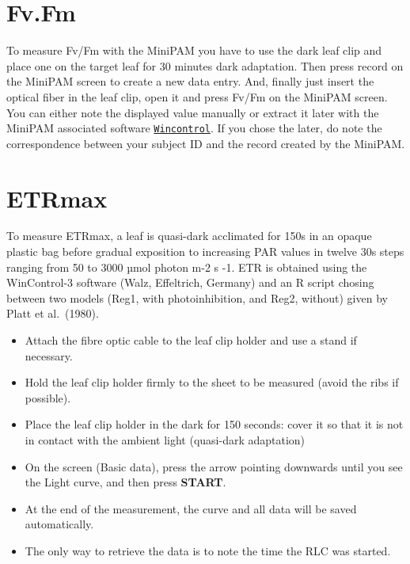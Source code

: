 \documentclass[
  12pt,
  american,
  a4paper,
  extrafontsizes,onecolumn,openright
  ]{memoir}
\providecommand{\tightlist}{%
  \setlength{\itemsep}{0pt}\setlength{\parskip}{0pt}}
\begin{document}
\hypertarget{fv.fm}{%
\section{Fv.Fm}\label{fv.fm}}

To measure Fv/Fm with the MiniPAM you have to use the dark leaf clip and place one on the target leaf for 30 minutes dark adaptation.
Then press record on the MiniPAM screen to create a new data entry.
And, finally just insert the optical fiber in the leaf clip, open it and press Fv/Fm on the MiniPAM screen.
You can either note the displayed value manually or extract it later with the MiniPAM associated software \href{https://www.walz.com/products/chl_p700/mini-pam-II/downloads.html}{\texttt{Wincontrol}}.
If you chose the later, do note the correspondence between your subject ID and the record created by the MiniPAM.

\hypertarget{etrmax}{%
\section{ETRmax}\label{etrmax}}

To measure ETRmax, a leaf is quasi-dark acclimated for 150s in an opaque plastic bag before gradual exposition to increasing PAR values in twelve 30s steps ranging from 50 to 3000 µmol photon m-2 s -1.
ETR is obtained using the WinControl-3 software (Walz, Effeltrich, Germany) and an R script chosing between two models (Reg1, with photoinhibition, and Reg2, without) given by Platt et al.~(1980).

\begin{itemize}
\tightlist
\item
  Attach the fibre optic cable to the leaf clip holder and use a stand if necessary.
\item
  Hold the leaf clip holder firmly to the sheet to be measured (avoid the ribs if possible).
\item
  Place the leaf clip holder in the dark for 150 seconds: cover it so that it is not in contact with the ambient light (quasi-dark adaptation)
\item
  On the screen (Basic data), press the arrow pointing downwards until you see the Light curve, and then press \textbf{START}.
\item
  At the end of the measurement, the curve and all data will be saved automatically.
\item
  The only way to retrieve the data is to note the time the RLC was started.
\end{itemize}
\end{document}

